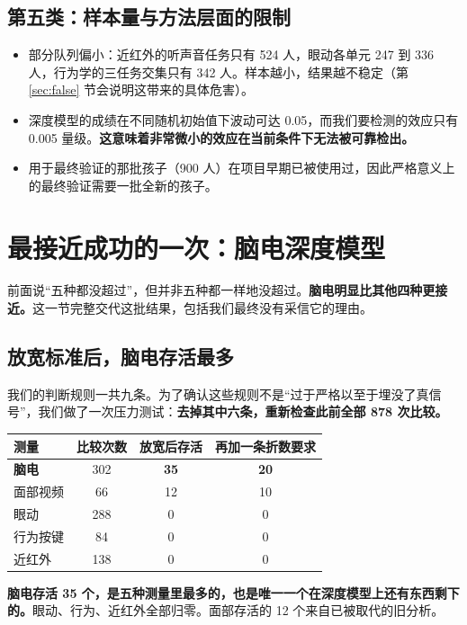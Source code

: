 \documentclass[UTF8,12pt,a4paper]{ctexart}
\newcommand{\key}[1]{\textbf{\textcolor{blue!45!black}{#1}}}
\begin{document}
\subsection{第五类：样本量与方法层面的限制}

\begin{itemize}
\item 部分队列偏小：近红外的听声音任务只有 524 人，眼动各单元 247 到 336 人，行为学的三任务交集只有 342 人。样本越小，结果越不稳定（第 \ref{sec:false} 节会说明这带来的具体危害）。
\item 深度模型的成绩在不同随机初始值下波动可达 0.05，而我们要检测的效应只有 0.005 量级。\key{这意味着非常微小的效应在当前条件下无法被可靠检出。}
\item 用于最终验证的那批孩子（900 人）在项目早期已被使用过，因此严格意义上的最终验证需要一批全新的孩子。
\end{itemize}

\newpage
\section{最接近成功的一次：脑电深度模型}\label{sec:eeg}

前面说“五种都没超过”，但并非五种都一样地没超过。\key{脑电明显比其他四种更接近。}这一节完整交代这批结果，包括我们最终没有采信它的理由。

\subsection{放宽标准后，脑电存活最多}

我们的判断规则一共九条。为了确认这些规则不是“过于严格以至于埋没了真信号”，我们做了一次压力测试：\key{去掉其中六条，重新检查此前全部 878 次比较。}

\begin{center}
\begin{tabular}{@{}lccc@{}}
\toprule
\textbf{测量} & \textbf{比较次数} & \textbf{放宽后存活} & \textbf{再加一条折数要求} \\
\midrule
\textbf{脑电} & 302 & \textbf{35} & \textbf{20} \\
面部视频 & 66 & 12 & 10 \\
眼动 & 288 & 0 & 0 \\
行为按键 & 84 & 0 & 0 \\
近红外 & 138 & 0 & 0 \\
\bottomrule
\end{tabular}
\end{center}

\noindent \key{脑电存活 35 个，是五种测量里最多的，也是唯一一个在深度模型上还有东西剩下的。}眼动、行为、近红外全部归零。面部存活的 12 个来自已被取代的旧分析。
\end{document}
